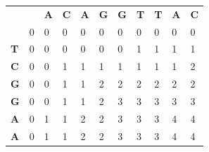 \documentclass[12pt,letterpaper]{article}
\begin{document}
\begin{enumerate}
    \begin{table}[!htb]
        \centering
        \begin{tabular}{lllllllllll}
                                        &                        & \textbf{A}             & \textbf{C}             & \textbf{A}             & \textbf{G}             & \textbf{G}             & \textbf{T}             & \textbf{T}             & \textbf{A}             & \textbf{C}             \\ \cline{2-11} 
        \multicolumn{1}{l|}{}           & \multicolumn{1}{l|}{0} & \multicolumn{1}{l|}{0} & \multicolumn{1}{l|}{0} & \multicolumn{1}{l|}{0} & \multicolumn{1}{l|}{0} & \multicolumn{1}{l|}{0} & \multicolumn{1}{l|}{0} & \multicolumn{1}{l|}{0} & \multicolumn{1}{l|}{0} & \multicolumn{1}{l|}{0} \\ \cline{2-11} 
        \multicolumn{1}{l|}{\textbf{T}} & \multicolumn{1}{l|}{0} & \multicolumn{1}{l|}{0} & \multicolumn{1}{l|}{0} & \multicolumn{1}{l|}{0} & \multicolumn{1}{l|}{0} & \multicolumn{1}{l|}{0} & \multicolumn{1}{l|}{1} & \multicolumn{1}{l|}{1} & \multicolumn{1}{l|}{1} & \multicolumn{1}{l|}{1} \\ \cline{2-11} 
        \multicolumn{1}{l|}{\textbf{C}} & \multicolumn{1}{l|}{0} & \multicolumn{1}{l|}{0} & \multicolumn{1}{l|}{1} & \multicolumn{1}{l|}{1} & \multicolumn{1}{l|}{1} & \multicolumn{1}{l|}{1} & \multicolumn{1}{l|}{1} & \multicolumn{1}{l|}{1} & \multicolumn{1}{l|}{1} & \multicolumn{1}{l|}{2} \\ \cline{2-11} 
        \multicolumn{1}{l|}{\textbf{G}} & \multicolumn{1}{l|}{0} & \multicolumn{1}{l|}{0} & \multicolumn{1}{l|}{1} & \multicolumn{1}{l|}{1} & \multicolumn{1}{l|}{2} & \multicolumn{1}{l|}{2} & \multicolumn{1}{l|}{2} & \multicolumn{1}{l|}{2} & \multicolumn{1}{l|}{2} & \multicolumn{1}{l|}{2} \\ \cline{2-11} 
        \multicolumn{1}{l|}{\textbf{G}} & \multicolumn{1}{l|}{0} & \multicolumn{1}{l|}{0} & \multicolumn{1}{l|}{1} & \multicolumn{1}{l|}{1} & \multicolumn{1}{l|}{2} & \multicolumn{1}{l|}{3} & \multicolumn{1}{l|}{3} & \multicolumn{1}{l|}{3} & \multicolumn{1}{l|}{3} & \multicolumn{1}{l|}{3} \\ \cline{2-11} 
        \multicolumn{1}{l|}{\textbf{A}} & \multicolumn{1}{l|}{0} & \multicolumn{1}{l|}{1} & \multicolumn{1}{l|}{1} & \multicolumn{1}{l|}{2} & \multicolumn{1}{l|}{2} & \multicolumn{1}{l|}{3} & \multicolumn{1}{l|}{3} & \multicolumn{1}{l|}{3} & \multicolumn{1}{l|}{4} & \multicolumn{1}{l|}{4} \\ \cline{2-11} 
        \multicolumn{1}{l|}{\textbf{A}} & \multicolumn{1}{l|}{0} & \multicolumn{1}{l|}{1} & \multicolumn{1}{l|}{1} & \multicolumn{1}{l|}{2} & \multicolumn{1}{l|}{2} & \multicolumn{1}{l|}{3} & \multicolumn{1}{l|}{3} & \multicolumn{1}{l|}{3} & \multicolumn{1}{l|}{4} & \multicolumn{1}{l|}{4} \\ \cline{2-11} 

\end{tabular}
\end{table}
\end{enumerate}
\end{document}
